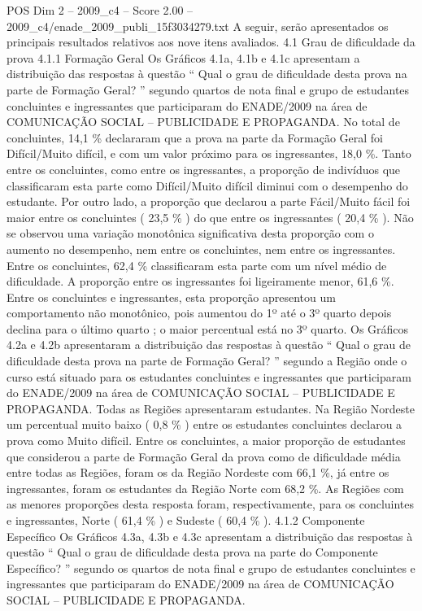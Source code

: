 \begin{textsample}{POS Dim 2 – 2009\_c4 – Score 2.00 – 2009\_c4/enade\_2009\_publi\_15f3034279.txt}
A seguir, serão apresentados os principais resultados relativos aos nove itens avaliados. 4.1 Grau de dificuldade da prova 4.1.1 Formação Geral Os Gráficos 4.1a, 4.1b e 4.1c apresentam a distribuição das respostas à questão “ Qual o grau de dificuldade desta prova na parte de Formação Geral? ” segundo quartos de nota final e grupo de estudantes concluintes e ingressantes que participaram do ENADE/2009 na área de COMUNICAÇÃO SOCIAL – PUBLICIDADE E PROPAGANDA.
No total de concluintes, 14,1 \% declararam que a prova na parte da Formação Geral foi Difícil/Muito difícil, e com um valor próximo para os ingressantes, 18,0 \%.
Tanto entre os concluintes, como entre os ingressantes, a proporção de indivíduos que classificaram esta parte como Difícil/Muito difícil diminui com o desempenho do estudante.
Por outro lado, a proporção que declarou a parte Fácil/Muito fácil foi maior entre os concluintes ( 23,5 \% ) do que entre os ingressantes ( 20,4 \% ).
Não se observou uma variação monotônica significativa desta proporção com o aumento no desempenho, nem entre os concluintes, nem entre os ingressantes.
Entre os concluintes, 62,4 \% classificaram esta parte com um nível médio de dificuldade.
A proporção entre os ingressantes foi ligeiramente menor, 61,6 \%.
Entre os concluintes e ingressantes, esta proporção apresentou um comportamento não monotônico, pois aumentou do 1º até o 3º quarto depois declina para o último quarto ; o maior percentual está no 3º quarto.
Os Gráficos 4.2a e 4.2b apresentaram a distribuição das respostas à questão “ Qual o grau de dificuldade desta prova na parte de Formação Geral? ” segundo a Região onde o curso está situado para os estudantes concluintes e ingressantes que participaram do ENADE/2009 na área de COMUNICAÇÃO SOCIAL – PUBLICIDADE E PROPAGANDA.
Todas as Regiões apresentaram estudantes.
Na Região Nordeste um percentual muito baixo ( 0,8 \% ) entre os estudantes concluintes declarou a prova como Muito difícil.
Entre os concluintes, a maior proporção de estudantes que considerou a parte de Formação Geral da prova como de dificuldade média entre todas as Regiões, foram os da Região Nordeste com 66,1 \%, já entre os ingressantes, foram os estudantes da Região Norte com 68,2 \%.
As Regiões com as menores proporções desta resposta foram, respectivamente, para os concluintes e ingressantes, Norte ( 61,4 \% ) e Sudeste ( 60,4 \% ). 4.1.2 Componente Específico Os Gráficos 4.3a, 4.3b e 4.3c apresentam a distribuição das respostas à questão “ Qual o grau de dificuldade desta prova na parte do Componente Específico? ” segundo os quartos de nota final e grupo de estudantes concluintes e ingressantes que participaram do ENADE/2009 na área de COMUNICAÇÃO SOCIAL – PUBLICIDADE E PROPAGANDA.

\end{textsample}
